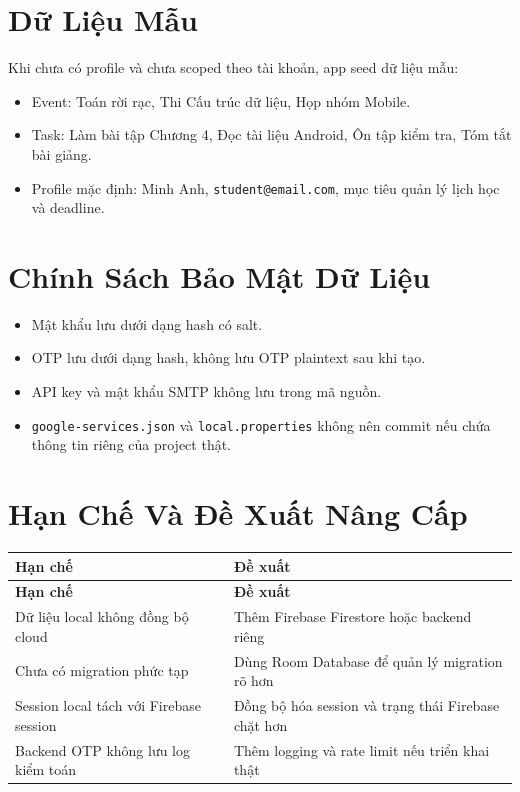 \documentclass[12pt,a4paper]{report}
\begin{document}
\section{Dữ Liệu Mẫu}

Khi chưa có profile và chưa scoped theo tài khoản, app seed dữ liệu mẫu:

\begin{itemize}
\item Event: Toán rời rạc, Thi Cấu trúc dữ liệu, Họp nhóm Mobile.
\item Task: Làm bài tập Chương 4, Đọc tài liệu Android, Ôn tập kiểm tra, Tóm tắt bài giảng.
\item Profile mặc định: Minh Anh, \texttt{student@email.com}, mục tiêu quản lý lịch học và deadline.
\end{itemize}

\section{Chính Sách Bảo Mật Dữ Liệu}

\begin{itemize}
\item Mật khẩu lưu dưới dạng hash có salt.
\item OTP lưu dưới dạng hash, không lưu OTP plaintext sau khi tạo.
\item API key và mật khẩu SMTP không lưu trong mã nguồn.
\item \texttt{google-services.json} và \texttt{local.properties} không nên commit nếu chứa thông tin riêng của project thật.
\end{itemize}

\section{Hạn Chế Và Đề Xuất Nâng Cấp}

\begin{longtable}{|>{\raggedright\arraybackslash}p{}|>{\raggedright\arraybackslash}p{}|}
\hline
\textbf{Hạn chế} & \textbf{Đề xuất} \\ \hline
\endfirsthead
\hline
\textbf{Hạn chế} & \textbf{Đề xuất} \\ \hline
\endhead
Dữ liệu local không đồng bộ cloud & Thêm Firebase Firestore hoặc backend riêng \\ \hline
Chưa có migration phức tạp & Dùng Room Database để quản lý migration rõ hơn \\ \hline
Session local tách với Firebase session & Đồng bộ hóa session và trạng thái Firebase chặt hơn \\ \hline
Backend OTP không lưu log kiểm toán & Thêm logging và rate limit nếu triển khai thật \\ \hline
\end{longtable}
\clearpage
\end{document}
